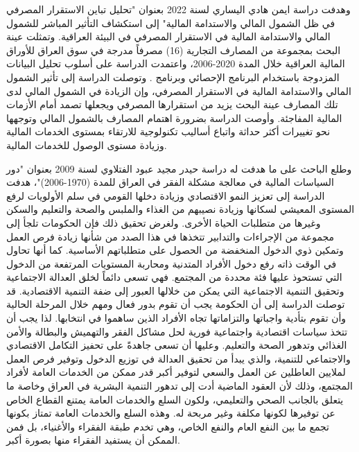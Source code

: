 \documentclass[10pt,a4paper]{report}
\begin{document}
\begin{doublespacing}
وهدفت دراسة {ايمن هادي اليساري} لسنة 2022 بعنوان "تحليل تباين الاستقرار المصرفي في ظل الشمول المالي والاستدامة المالية" إلى استكشاف التأثير المباشر للشمول المالي والاستدامة المالية في الاستقرار المصرفي في البيئة العراقية. وتمثلت عينة البحث بمجموعة من المصارف التجارية (16) مصرفاً مدرجة في سوق العراق للأوراق المالية العراقية خلال المدة 2020-2006، واعتمدت الدراسة على أسلوب تحليل البيانات المزدوجة  باستخدام البرنامج الإحصائي  وبرنامج . وتوصلت الدراسة إلى تأثير الشمول المالي والاستدامة المالية في الاستقرار المصرفي، وإن الزيادة في الشمول المالي لدى تلك المصارف عينة البحث يزيد من استقرارها المصرفي ويجعلها تصمد أمام الأزمات المالية المفاجئة. وأوصت الدراسة بضرورة اهتمام المصارف بالشمول المالي وتوجهها نحو تغييرات أكثر حداثة واتباع أساليب تكنولوجية للارتقاء بمستوى الخدمات المالية وزيادة مستوى الوصول للخدمات المالية.

وطلع الباحث على ما هدفت له دراسة {حيدر مجيد عبود الفتلاوي} لسنة 2009 بعنوان "دور السياسات المالية في معالجة مشكلة الفقر في العراق للمدة (1970-2006)"، هدفت الدراسة إلى تعزيز النمو الاقتصادي وزيادة دخلها القومي في سلم الأولويات لرفع المستوى المعيشي لسكانها وزيادة نصيبهم من الغذاء والملبس والصحة والتعليم والسكن وغيرها من متطلبات الحياة الأخرى. ولغرض تحقيق ذلك فإن الحكومات تلجأ إلى مجموعة من الإجراءات والتدابير تتخذها في هذا الصدد من شأنها زيادة فرص العمل وتمكين ذوي الدخول المنخفضة من الحصول على متطلباتهم الأساسية. كما أنها تحاول في الوقت ذاته رفع دخول الأفراد المتدنية ومحاربة المستويات المرتفعة من الدخول التي تستحوذ عليها فئة محددة من المجتمع. فهي تسعى دائماً لخلق العدالة الاجتماعية وتحقيق التنمية الاجتماعية التي يمكن من خلالها العبور إلى ضفة التنمية الاقتصادية. قد توصلت الدراسة إلى أن الحكومة يجب أن تقوم بدور فعال ومهم خلال المرحلة الحالية وأن تقوم بتأدية واجباتها والتزاماتها تجاه الأفراد الذين ساهموا في انتخابها. لذا يجب أن تتخذ سياسات اقتصادية واجتماعية فورية لحل مشاكل الفقر والتهميش والبطالة والأمن الغذائي وتدهور الصحة والتعليم. وعليها أن تسعى جاهدةً على تحفيز التكامل الاقتصادي والاجتماعي للتنمية، والذي يبدأ من تحقيق العدالة في توزيع الدخول وتوفير فرص العمل لملايين العاطلين عن العمل والسعي لتوفير أكبر قدر ممكن من الخدمات العامة لأفراد المجتمع، وذلك لأن العقود الماضية أدت إلى تدهور التنمية البشرية في العراق وخاصة ما يتعلق بالجانب الصحي والتعليمي، ولكون السلع والخدمات العامة يمتنع القطاع الخاص عن توفيرها لكونها مكلفة وغير مربحة له. وهذه السلع والخدمات العامة تمتاز بكونها تجمع ما بين النفع العام والنفع الخاص، وهي تخدم طبقة الفقراء والأغنياء، بل فمن الممكن أن يستفيد الفقراء منها بصورة أكبر.


\end{doublespacing}
\end{document}
